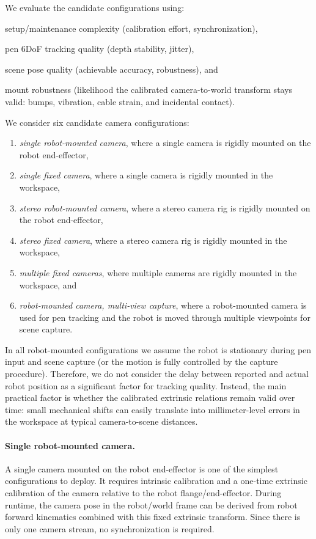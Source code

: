 We evaluate the candidate configurations using:
\begin{enumerate*}[label=(\roman*)]
    \item setup/maintenance complexity (calibration effort, synchronization),
    \item pen 6DoF tracking quality (depth stability, jitter),
    \item scene pose quality (achievable accuracy, robustness), and
    \item mount robustness (likelihood the calibrated camera-to-world transform stays valid: bumps, vibration, cable strain, and incidental contact).
\end{enumerate*}

We consider six candidate camera configurations:
\begin{enumerate}[label=(\roman*), itemsep=0.2em]
    \item \emph{single robot-mounted camera}, where a single camera is rigidly mounted on the robot end-effector,
    \item \emph{single fixed camera}, where a single camera is rigidly mounted in the workspace,
    \item \emph{stereo robot-mounted camera}, where a stereo camera rig is rigidly mounted on the robot end-effector,
    \item \emph{stereo fixed camera}, where a stereo camera rig is rigidly mounted in the workspace,
    \item \emph{multiple fixed cameras}, where multiple cameras are rigidly mounted in the workspace, and
    \item \emph{robot-mounted camera, multi-view capture}, where a robot-mounted camera is used for pen tracking and the robot is moved through multiple viewpoints for scene capture.
\end{enumerate}

In all robot-mounted configurations we assume the robot is stationary during pen input and scene capture (or the motion is fully controlled by the capture procedure). Therefore, we do not consider the delay between reported and actual robot position as a significant factor for tracking quality. Instead, the main practical factor is whether the calibrated extrinsic relations remain valid over time: small mechanical shifts can easily translate into millimeter-level errors in the workspace at typical camera-to-scene distances.

\paragraph{Single robot-mounted camera.}
A single camera mounted on the robot end-effector is one of the simplest configurations to deploy. It requires intrinsic calibration and a one-time extrinsic calibration of the camera relative to the robot flange/end-effector. During runtime, the camera pose in the robot/world frame can be derived from robot forward kinematics combined with this fixed extrinsic transform. Since there is only one camera stream, no synchronization is required.


